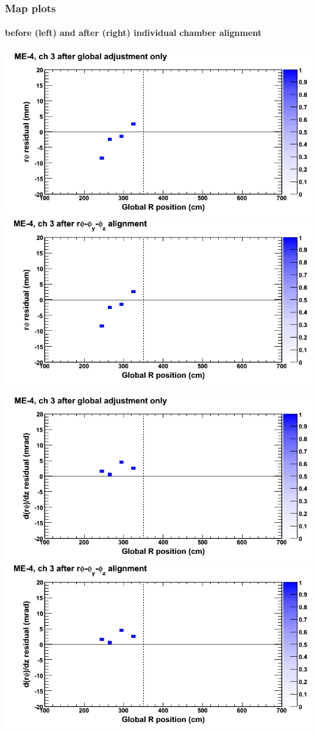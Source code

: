 \documentclass[compress]{beamer}
\begin{document}
\begin{frame}
\frametitle{Map plots}
\framesubtitle{before (left) and after (right) individual chamber alignment}
\includegraphics[width=0.5\linewidth]{ringmapplots_3dof/before_CSCvsr_mem4ch03_x.png} \includegraphics[width=0.5\linewidth]{ringmapplots_3dof/after_CSCvsr_mem4ch03_x.png}

\includegraphics[width=0.5\linewidth]{ringmapplots_3dof/before_CSCvsr_mem4ch03_dxdz.png} \includegraphics[width=0.5\linewidth]{ringmapplots_3dof/after_CSCvsr_mem4ch03_dxdz.png}
\end{frame}
\end{document}
